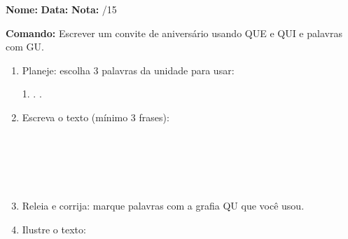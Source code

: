 \begin{exercicio}

\noindent\textbf{Nome:} \underline{\hspace{3.2cm}} \quad \textbf{Data:} \underline{\hspace{1.6cm}} \quad \textbf{Nota:} \underline{\hspace{0.9cm}}/15


\noindent\textbf{Comando:} Escrever um convite de aniversário usando QUE e QUI e palavras com GU.


\begin{enumerate}

  \item Planeje: escolha 3 palavras da unidade para usar:
  \begin{center}
  1. \underline{\hspace{3cm}} . \underline{\hspace{3cm}} . \underline{\hspace{3cm}}
  \end{center}

  \item Escreva o texto (mínimo 3 frases):
  \begin{center}
  \underline{\hspace{12cm}}\\\underline{\hspace{12cm}}\\\underline{\hspace{12cm}}\\\underline{\hspace{12cm}}\\\underline{\hspace{12cm}}
  \end{center}

  \item Releia e corrija: marque palavras com a grafia QU que você usou.

  \item Ilustre o texto:
  \begin{center}
  \end{center}

\end{enumerate}

\end{exercicio}

